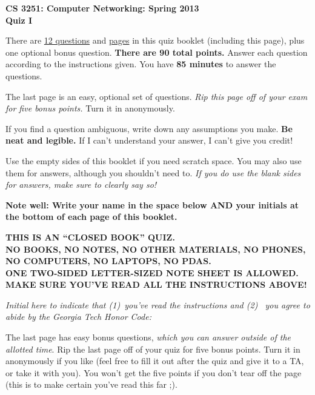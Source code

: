 \documentclass[11pt]{article}
\newcounter{answer}
\begin{document}
\begin{center}
{\Large{\bf CS 3251: Computer Networking: Spring 2013} \\
 \vspace{.15in} \Huge{\bf Quiz I}} 
\vspace{.2in}

\begin{boxedminipage}[h]{6in}
There are \underline{12 questions} and \underline{\pageref{lastpage}
  pages} in this quiz booklet (including this page), plus one optional
bonus question. {\bf There are 90 total points.}  Answer each question according to the instructions
given.  You have {\bf 85 minutes} to answer the questions.

\vspace{.1in} The last page is an easy, optional set of questions.  {\em
  Rip this page off of your exam for five bonus points.}  Turn it in
anonymously.


\vspace{.1in} 
If you find a question ambiguous, write down any
assumptions you make.  {\bf Be neat and legible.}  If I can't
understand your answer, I can't give you credit!  

\vspace{.1in} 
Use the empty sides of this booklet if you need scratch space.  You
may also use them for answers, although you shouldn't need to.  {\em If you
do use the blank sides for answers, make sure to clearly say so!}

\vspace{.1in} 
{\bf Note well: Write your name in the space below AND your initials at the bottom of each
page of this booklet.}

\begin{center}{\bf THIS IS AN ``CLOSED BOOK'' QUIZ.\\
NO BOOKS, NO NOTES, NO OTHER MATERIALS, NO PHONES, NO COMPUTERS, NO
LAPTOPS, NO PDAS.\\ 
ONE TWO-SIDED LETTER-SIZED NOTE SHEET IS ALLOWED.
MAKE SURE YOU'VE READ ALL THE INSTRUCTIONS ABOVE!}
\end{center}
{\em Initial here to indicate that (1)~you've read the instructions and (2)~
you agree to abide by the Georgia Tech Honor Code: }



\vspace{.05in} The last page has easy bonus questions, {\em which you can
answer outside of the allotted time}.  Rip the last page off of your
quiz for five bonus points.  Turn it in anonymously if you like (feel
free to fill it out after the quiz and give it to a TA, or take it with you).  You
won't get the five points if you don't tear off the page (this is to
make certain you've read this far ;).
\fi 

\end{boxedminipage}
\end{center}
\end{document}
